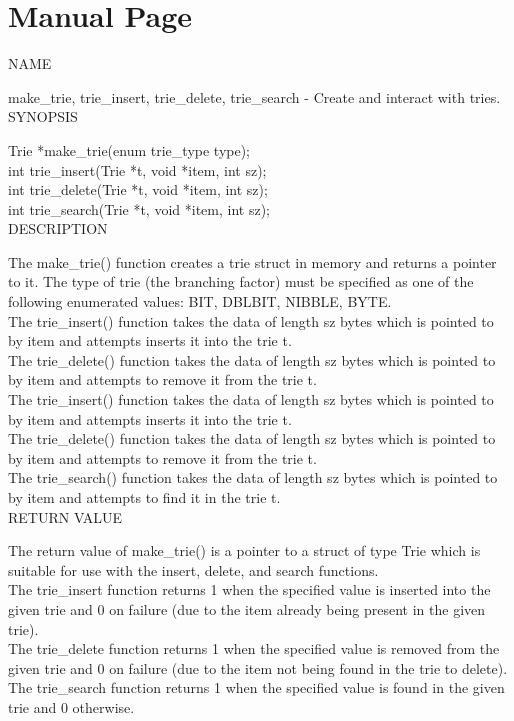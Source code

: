 \documentclass{llncs}
\begin{document}
\section{Manual Page}
\noindent NAME

make\_trie, trie\_insert, trie\_delete, trie\_search - Create and interact with tries.\\

\noindent SYNOPSIS

Trie *make\_trie(enum trie\_type type);\\
int trie\_insert(Trie *t, void *item, int sz);\\
int trie\_delete(Trie *t, void *item, int sz);\\
int trie\_search(Trie *t, void *item, int sz);\\

\noindent DESCRIPTION

The make\_trie() function creates a trie struct in memory and returns a pointer to it. The type of trie (the branching factor) must be specified as one of the following enumerated values: BIT, DBLBIT, NIBBLE, BYTE.\\
The trie\_insert() function takes the data of length sz bytes which is pointed to by item and attempts inserts it into the trie t.\\
The trie\_delete() function takes the data of length sz bytes which is pointed to by item and attempts to remove it from the trie t.\\
The trie\_insert() function takes the data of length sz bytes which is pointed to by item and attempts inserts it into the trie t.\\
The trie\_delete() function takes the data of length sz bytes which is pointed to by item and attempts to remove it from the trie t.\\
The trie\_search() function takes the data of length sz bytes which is pointed to by item and attempts to find it in the trie t.\\

\noindent RETURN VALUE

\noindent The return value of make\_trie() is a pointer to a struct of type Trie which is suitable for use with the insert, delete, and search functions.\\
The trie\_insert function returns 1 when the specified value is inserted into the given trie and 0 on failure (due to the item already being present in the given trie).\\
The trie\_delete function returns 1 when the specified value is removed from the given trie and 0 on failure (due to the item not being found in the trie to delete).\\
The trie\_search function returns 1 when the specified value is found in the given trie and 0 otherwise.\\
\end{document}
